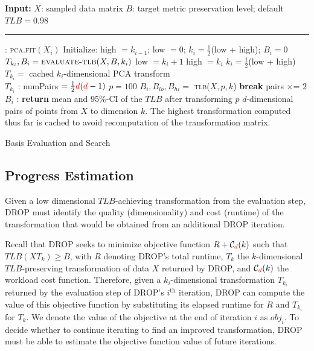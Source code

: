 \begin{algorithm}
\begin{algorithmic}[1]
\small
\Statex \textbf{Input:}  
\Statex $X$: sampled data matrix
\Statex $B$: target metric preservation level; default $TLB = 0.98$
\Statex  \hrule 
{}: \label{eq:basis}
	\State \textsc{pca.fit}$(X_i)$
	\State Initialize: high $= k_{i-1}$; low $=0$; $k_i= \frac{1}{2}$(low + high); $B_i = 0$
		\State $T_{k_i}, B_i  = \textsc{evaluate-tlb}( X, B, k_i)$
		  low $= k_i + 1$ 
		\Else  \hspace{0pt} high $= k_i $
		\EndIf
		\State $k_i = \frac{1}{2}$(low + high)
	\EndWhile
	\State $T_{k_i} = $ cached $k_i$-dimensional PCA transform\\
	\Return $T_{k_i}$
\EndFunction
\Statex 
{}: \label{eq:eval}
	\State numPairs $= \frac{1}{2}{\color{red}d}({\color{red}d}-1)$
	\State $p = 100$
		\State $B_i, B_{lo}, B_{hi} = $ \textsc{tlb}($ X, p, k$)
			 \label{eq:paircheck}
		   \textbf{break}
		\Else \hspace{0pt} pairs $\times$= $ 2$
		\EndIf
	\EndWhile
	\\\Return $B_i$	
\EndFunction
\Statex 
{}: \label{eq:tlbeval}
	\State \textbf{return } mean and 95\%-CI of the $TLB$ after transforming $p$ $d$-dimensional pairs of points from $X$ to dimension $k$. The highest transformation computed thus far is cached to avoid recomputation of the transformation matrix.
\EndFunction

\end{algorithmic}
\caption{Basis Evaluation and Search}
\label{alg:candidate}
\end{algorithm}


\subsection{Progress Estimation}
\label{subsec:pest}
Given a low dimensional $TLB$-achieving transformation from the evaluation step, DROP must identify the quality (dimensionality) and cost (runtime) of the transformation that would be obtained from an additional DROP iteration.

Recall that DROP seeks to minimize objective function $R + \mathcal{C}_{\color{red}d}(k)$ such that $TLB(XT_k) \geq B$, with $R$ denoting DROP's total runtime, $T_k$ the $k$-dimensional $TLB$-preserving transformation of data $X$ returned by DROP, and $\mathcal{C}_{\color{red}d}(k)$ the workload cost function. 
Therefore, given a $k_i$-dimensional transformation $T_{k_i}$ returned by the evaluation step of DROP's $i^{\text{th}}$ iteration, DROP can compute the value of this objective function by substituting its elapsed runtime for $R$ and $T_{k_i}$ for $T_k$.  
We denote the value of the objective at the end of iteration $i$ as $obj_i$. 
To decide whether to continue iterating to find an improved transformation, DROP must be able to estimate the objective function value of future iterations.

